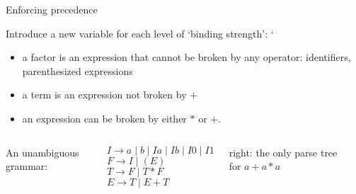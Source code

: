 \documentclass[handout]{beamer}
\begin{document}
\begin{frame}{Enforcing precedence}

	Introduce a new variable for each level of `binding strength':
`	\begin{itemize}
		\item a \alert{factor} is an expression that cannot be broken by any operator: identifiers, parenthesized expressions
		\item a \alert{term} is an expression not broken by $+$
		\item an \alert{expression} can be broken by either $*$ or $+$.
	\end{itemize}
	
	\begin{columns}


		An unambiguous grammar:

		\bigskip
		
		$I\rightarrow  a\mid  b\mid Ia\mid Ib\mid I0\mid I1$\\
		$F\rightarrow  I\mid (E) $\\
		$T\rightarrow  F\mid T*F $\\
		$E\rightarrow  T\mid E+T $

		\bigskip

		right: the only parse tree for $a+a*a$
			
		
		\begin{center}
			\scalebox{0.8}{
				\begin{forest}
					[E [E[T[F[I[a]]]]][+][T[T[F[I[a]]]][*][F[I[a]]]]]
				\end{forest}
			}
		\end{center}
				
	\end{columns}

\end{frame}
\end{document}
